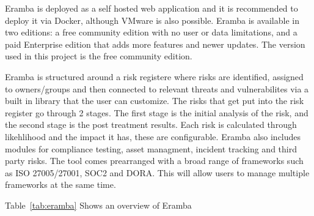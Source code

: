 Eramba is deployed as a self hosted web application and it is recommended to deploy it via Docker, although VMware is also possible. Eramba is available in two editions: a free community edition with no user or data limitations, and a paid Enterprise edition that adds more features and newer updates. The version used in this project is the free community edition.

Eramba is structured around a risk registere where risks are identified, assigned to owners/groups and then connected to relevant threats and vulnerabilites via a built in library that the user can customize. The risks that get put into the risk register go through 2 stages. The first stage is the initial analysis of the risk, and the second stage is the post treatment results. Each risk is calculated through likehlihood and the impact it has, these are configurable. Eramba also includes modules for compliance testing, asset managment, incident tracking and third party risks. The tool comes prearranged with a broad range of frameworks such as ISO 27005/27001, SOC2 and DORA. This will allow users to manage multiple frameworks at the same time.

Table~\ref{tab:eramba} Shows an overview of Eramba

